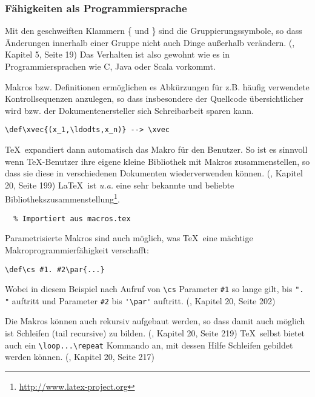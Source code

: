 \subsubsection{Fähigkeiten als Programmiersprache}

Mit den geschweiften Klammern \{ und \} sind die Gruppierungssymbole, so
dass Änderungen innerhalb einer Gruppe nicht auch Dinge außerhalb
verändern. (\cite{tex-a}, Kapitel 5, Seite 19)
Das Verhalten ist also gewohnt wie es in Programmiersprachen wie C,
Java oder Scala vorkommt.

Makros bzw. Definitionen ermöglichen es Abkürzungen für z.B. häufig
verwendete Kontrollsequenzen anzulegen, so dass insbesondere
der Quellcode übersichtlicher wird bzw. der Dokumentenersteller sich
Schreibarbeit sparen kann.

\begin{verbatim}
\def\xvec{(x_1,\ldodts,x_n)} --> \xvec
\end{verbatim}

\TeX~expandiert dann automatisch das Makro für den Benutzer.
So ist es sinnvoll wenn \TeX-Benutzer ihre eigene kleine Bibliothek mit
Makros zusammenstellen, so dass sie diese in verschiedenen Dokumenten
wiederverwenden können. (\cite{tex-a}, Kapitel 20, Seite 199)
\LaTeX~ist \emph{u.a.} eine sehr bekannte und beliebte
Bibliothekszusammenstellung\footnote{\url{http://www.latex-project.org}}.

\begin{verbatim}
  % Importiert aus macros.tex
\end{verbatim}

Parametrisierte Makros sind auch möglich, was \TeX~eine mächtige
Makroprogrammierfähigkeit verschafft:

\begin{verbatim}
\def\cs #1. #2\par{...}
\end{verbatim}

Wobei in diesem Beispiel nach Aufruf von \lstinline|\cs| Parameter
\lstinline|#1| so lange gilt,
bis \lstinline|". "| auftritt und Parameter \lstinline|#2|
bis \lstinline|'\par'| auftritt. (\cite{tex-a}, Kapitel 20, Seite 202)

Die Makros können auch rekursiv aufgebaut werden, so dass damit auch möglich ist
Schleifen (tail recursive) zu bilden.
(\cite{tex-a}, Kapitel 20, Seite 219)
\TeX~selbst bietet auch ein \lstinline|\loop...\repeat| Kommando an,
mit dessen Hilfe Schleifen gebildet werden können.
(\cite{tex-a}, Kapitel 20, Seite 217)


